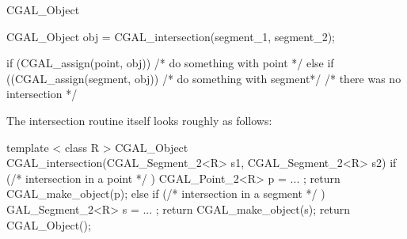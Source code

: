 \begin{class} {CGAL_Object}
\begin{cprog}
{  CGAL_Object obj = CGAL_intersection(segment_1, segment_2);

  if (CGAL_assign(point, obj)) {
      /* do something with point */
  } else if ((CGAL_assign(segment, obj)) {
      /* do something with segment*/
  }
  /*  there was no intersection */
}
\end{cprog}

\medskip
The intersection routine itself looks roughly as follows:

\begin{cprog}

template < class R >
CGAL_Object  CGAL_intersection(CGAL_Segment_2<R> s1, CGAL_Segment_2<R> s2)
{
  if (/* intersection in a point */ ) {
     CGAL_Point_2<R> p = ... ;
     return CGAL_make_object(p);
  } else if (/* intersection in a segment */ ) {
     GAL_Segment_2<R> s = ... ;
     return CGAL_make_object(s);
  }
  return CGAL_Object();
}
\end{cprog} 
\end{class} 

